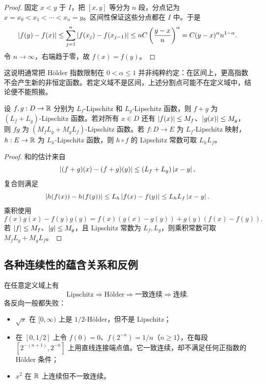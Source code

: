 \begin{proof}
固定 \(x<y\) 于 \(I\)，把 \([x,y]\) 等分为 \(n\) 段，分点记为 \(x=x_0<x_1<\cdots<x_n=y\)。区间性保证这些分点都在 \(I\) 中。于是
\[
 \left|f(y)-f(x)\right|
 \le\sum_{j=1}^{n}\left|f(x_j)-f(x_{j-1})\right|
 \le nC\left(\frac{y-x}{n}\right)^\alpha
 =C(y-x)^\alpha n^{1-\alpha}.
\]
令 \(n\to\infty\)，右端趋于零，故 \(f(x)=f(y)\)。
\end{proof}

这说明通常把 Hölder 指数限制在 \(0<\alpha\le1\) 并非纯粹约定：在区间上，更高指数不会产生新的非恒定函数。若定义域不是区间，上述分割点可能不在定义域中，结论便不能照搬。

\begin{proposition}
设 \(f,g:D\to\mathbb{R}\) 分别为 \(L_f\)-Lipschitz 和 \(L_g\)-Lipschitz 函数，则 \(f+g\) 为 \((L_f+L_g)\)-Lipschitz 函数。若对所有 \(x\in D\) 还有 \(\left|f(x)\right|\le M_f\)、\(\left|g(x)\right|\le M_g\)，则 \(fg\) 为 \((M_fL_g+M_gL_f)\)-Lipschitz 函数。若 \(f:D\to E\) 为 \(L_f\)-Lipschitz 映射，\(h:E\to\mathbb{R}\) 为 \(L_h\)-Lipschitz 函数，则 \(h\circ f\) 的 Lipschitz 常数可取 \(L_hL_f\)。
\end{proposition}

\begin{proof}
和的估计来自
\[
 \left|(f+g)(x)-(f+g)(y)\right|
 \le (L_f+L_g)\left|x-y\right|,
\]
复合则满足
\[
 \left|h(f(x))-h(f(y))\right|
 \le L_h\left|f(x)-f(y)\right|
 \le L_hL_f\left|x-y\right|.
\]
乘积使用
\[
 f(x)g(x)-f(y)g(y)
 =f(x)(g(x)-g(y))+g(y)(f(x)-f(y)).
\]
若 \(\left|f\right|\le M_f\)、\(\left|g\right|\le M_g\)，且 Lipschitz 常数为 \(L_f,L_g\)，则乘积常数可取 \(M_fL_g+M_gL_f\)。
\end{proof}

\subsection{各种连续性的蕴含关系和反例}


在任意定义域上有
\[
 \text{Lipschitz}
 \Longrightarrow
 \text{Hölder}
 \Longrightarrow
 \text{一致连续}
 \Longrightarrow
 \text{连续}.
\]
各反向一般都失败：
\begin{itemize}
 \item \(\sqrt x\) 在 \([0,\infty)\) 上是 \(1/2\)-Hölder，但不是 Lipschitz；
 \item 在 \([0,1/2]\) 上令 \(f(0)=0\)、\(f(2^{-n})=1/n\)（\(n\ge1\)），在每段 \([2^{-(n+1)},2^{-n}]\) 上用直线连接端点值。它一致连续，却不满足任何正指数的 Hölder 条件；
 \item \(x^2\) 在 \(\mathbb{R}\) 上连续但不一致连续。
\end{itemize}

